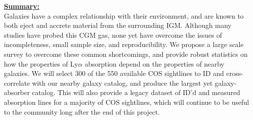 \documentclass[12pt]{article}
\begin{document}
\noindent \underline{\textbf{Summary: }}\\
\indent Galaxies have a complex relationship with their environment, and are known to both eject and accrete material from the surrounding IGM. Although many studies have probed this CGM gas, none yet have overcome the issues of incompleteness, small sample size, and reproducibility. We propose a large scale survey to overcome these common shortcomings, and provide robust statistics on how the properties of Ly$\alpha$ absorption depend on the properties of nearby galaxies. We will select 300 of the 550 available COS sightlines to ID and cross-correlate with our nearby galaxy catalog, and produce the largest yet galaxy-absorber catalog. This will also provide a legacy dataset of ID'd and measured absorption lines for a majority of COS sightlines, which will continue to be useful to the community long after the end of this project.\\


%



\end{document}
